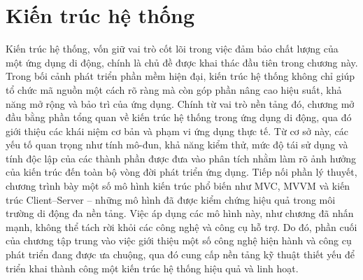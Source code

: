 
\chapter{Kiến trúc hệ thống}
\label{chap:Chap1}
\vspace{-0.8em}
\hspace*{0.8cm}Kiến trúc hệ thống, vốn giữ vai trò cốt lõi trong việc đảm bảo chất lượng của một ứng dụng di động, chính là chủ đề được khai thác đầu tiên trong chương này. Trong bối cảnh phát triển phần mềm hiện đại, kiến trúc hệ thống không chỉ giúp tổ chức mã nguồn một cách rõ ràng mà còn góp phần nâng cao hiệu suất, khả năng mở rộng và bảo trì của ứng dụng. Chính từ vai trò nền tảng đó, chương mở đầu bằng phần tổng quan về kiến trúc hệ thống trong ứng dụng di động, qua đó giới thiệu các khái niệm cơ bản và phạm vi ứng dụng thực tế. Từ cơ sở này, các yếu tố quan trọng như tính mô-đun, khả năng kiểm thử, mức độ tái sử dụng và tính độc lập của các thành phần được đưa vào phân tích nhằm làm rõ ảnh hưởng của kiến trúc đến toàn bộ vòng đời phát triển ứng dụng. Tiếp nối phần lý thuyết, chương trình bày một số mô hình kiến trúc phổ biến như MVC, MVVM và kiến trúc Client–Server – những mô hình đã được kiểm chứng hiệu quả trong môi trường di động đa nền tảng. Việc áp dụng các mô hình này, như chương đã nhấn mạnh, không thể tách rời khỏi các công nghệ và công cụ hỗ trợ. Do đó, phần cuối của chương tập trung vào việc giới thiệu một số công nghệ hiện hành và công cụ phát triển đang được ưa chuộng, qua đó cung cấp nền tảng kỹ thuật thiết yếu để triển khai thành công một kiến trúc hệ thống hiệu quả và linh hoạt.










